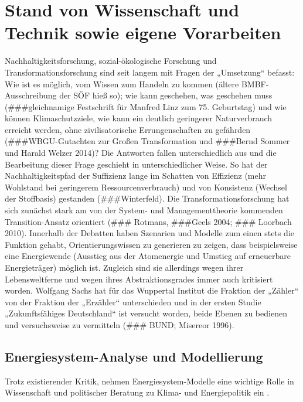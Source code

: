 \documentclass[a4paper,11pt,twoside]{scrartcl}
\begin{document}
\section{Stand von Wissenschaft und Technik sowie eigene Vorarbeiten}
Nachhaltigkeitsforschung, sozial-ökologische Forschung und Transformationsforschung sind seit langem mit Fragen der „Umsetzung“ befasst: Wie ist es möglich, vom Wissen zum Handeln zu kommen (ältere BMBF-Ausschreibung der SÖF hieß so); wie kann geschehen, was geschehen muss (###gleichnamige Festschrift für Manfred Linz zum 75. Geburtstag) und wie können Klimaschutzziele, wie kann ein deutlich geringerer Naturverbrauch erreicht werden, ohne zivilisatorische Errungenschaften zu gefährden (###WBGU-Gutachten zur Großen Transformation und ###Bernd Sommer und Harald Welzer  2014)? Die Antworten fallen unterschiedlich aus und die Bearbeitung dieser Frage geschieht in unterschiedlicher Weise. So hat der Nachhaltigkeitspfad der Suffizienz lange im Schatten von Effizienz (mehr Wohlstand bei geringerem Ressourcenverbrauch) und von Konsistenz (Wechsel der Stoffbasis) gestanden (###Winterfeld). Die Transformationsforschung hat sich zunächst stark am von der System- und Managementtheorie kommenden Transition-Ansatz orientiert (### Rotmans, ###Geels 2004; ### Loorbach 2010). Innerhalb der Debatten haben Szenarien und Modelle zum einen stets die Funktion gehabt, Orientierungswissen zu generieren zu zeigen, dass beispielsweise eine Energiewende (Ausstieg aus der Atomenergie und Umstieg auf erneuerbare Energieträger) möglich ist. Zugleich sind sie allerdings wegen ihrer Lebensweltferne und wegen ihres Abstraktionsgrades immer auch kritisiert worden. Wolfgang Sachs hat für das Wuppertal Institut die Fraktion der „Zähler“ von der Fraktion der „Erzähler“ unterschieden und in der ersten Studie „Zukunftsfähiges Deutschland“ ist versucht worden, beide Ebenen zu bedienen und versuchsweise zu vermitteln (### BUND; Misereor 1996).

\subsection*{Energiesystem-Analyse und Modellierung}
Trotz existierender Kritik, nehmen Energiesystem-Modelle eine wichtige Rolle in Wissenschaft und politischer Beratung zu Klima- und Energiepolitik ein \cite{Dieckhoff2015}.
\end{document}
